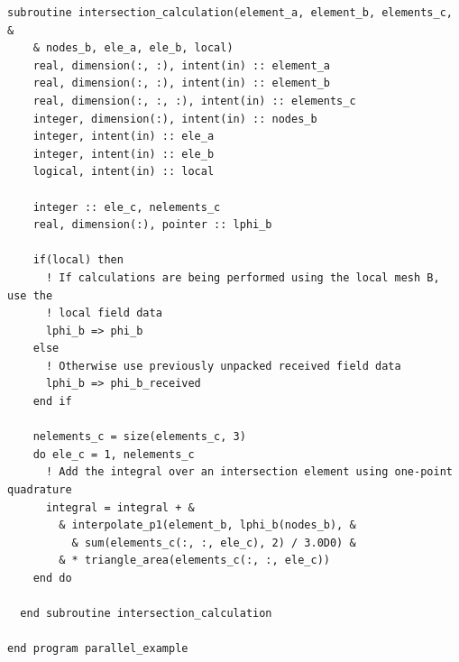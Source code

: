 \documentclass{article}
\begin{document}
\begin{lstlisting}[language=FORTRAN] 
  subroutine intersection_calculation(element_a, element_b, elements_c, &
    & nodes_b, ele_a, ele_b, local)
    real, dimension(:, :), intent(in) :: element_a
    real, dimension(:, :), intent(in) :: element_b
    real, dimension(:, :, :), intent(in) :: elements_c
    integer, dimension(:), intent(in) :: nodes_b
    integer, intent(in) :: ele_a
    integer, intent(in) :: ele_b
    logical, intent(in) :: local

    integer :: ele_c, nelements_c
    real, dimension(:), pointer :: lphi_b
    
    if(local) then
      ! If calculations are being performed using the local mesh B, use the
      ! local field data
      lphi_b => phi_b
    else
      ! Otherwise use previously unpacked received field data
      lphi_b => phi_b_received
    end if

    nelements_c = size(elements_c, 3)
    do ele_c = 1, nelements_c
      ! Add the integral over an intersection element using one-point quadrature
      integral = integral + &
        & interpolate_p1(element_b, lphi_b(nodes_b), &
          & sum(elements_c(:, :, ele_c), 2) / 3.0D0) &
        & * triangle_area(elements_c(:, :, ele_c))
    end do    
    
  end subroutine intersection_calculation
  
end program parallel_example
\end{lstlisting}
\end{document}
